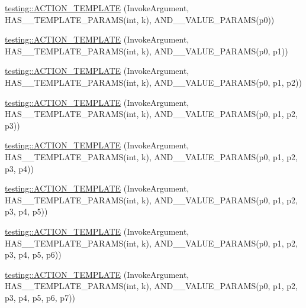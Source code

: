 \begin{DoxyCompactItemize}
\item 
\mbox{\hyperlink{namespacetesting_afaa0d88f5442f9aee5d6147377d3e50c}{testing\+::\+A\+C\+T\+I\+O\+N\+\_\+\+T\+E\+M\+P\+L\+A\+TE}} (Invoke\+Argument, H\+A\+S\+\_\+\_\+\+T\+E\+M\+P\+L\+A\+T\+E\+\_\+\+P\+A\+R\+A\+MS(int, k), A\+N\+D\+\_\+\_\+\+V\+A\+L\+U\+E\+\_\+\+P\+A\+R\+A\+MS(p0))
\item 
\mbox{\hyperlink{namespacetesting_a39bf6c49dc1323cc9539a12249e60aba}{testing\+::\+A\+C\+T\+I\+O\+N\+\_\+\+T\+E\+M\+P\+L\+A\+TE}} (Invoke\+Argument, H\+A\+S\+\_\+\_\+\+T\+E\+M\+P\+L\+A\+T\+E\+\_\+\+P\+A\+R\+A\+MS(int, k), A\+N\+D\+\_\+\_\+\+V\+A\+L\+U\+E\+\_\+\+P\+A\+R\+A\+MS(p0, p1))
\item 
\mbox{\hyperlink{namespacetesting_ac50647216fdf5197899a3d5034a9a670}{testing\+::\+A\+C\+T\+I\+O\+N\+\_\+\+T\+E\+M\+P\+L\+A\+TE}} (Invoke\+Argument, H\+A\+S\+\_\+\_\+\+T\+E\+M\+P\+L\+A\+T\+E\+\_\+\+P\+A\+R\+A\+MS(int, k), A\+N\+D\+\_\+\_\+\+V\+A\+L\+U\+E\+\_\+\+P\+A\+R\+A\+MS(p0, p1, p2))
\item 
\mbox{\hyperlink{namespacetesting_ae98e43eecf8f44990b39b460f00b397b}{testing\+::\+A\+C\+T\+I\+O\+N\+\_\+\+T\+E\+M\+P\+L\+A\+TE}} (Invoke\+Argument, H\+A\+S\+\_\+\_\+\+T\+E\+M\+P\+L\+A\+T\+E\+\_\+\+P\+A\+R\+A\+MS(int, k), A\+N\+D\+\_\+\_\+\+V\+A\+L\+U\+E\+\_\+\+P\+A\+R\+A\+MS(p0, p1, p2, p3))
\item 
\mbox{\hyperlink{namespacetesting_a505f6d82df233802c5f4235d77dca164}{testing\+::\+A\+C\+T\+I\+O\+N\+\_\+\+T\+E\+M\+P\+L\+A\+TE}} (Invoke\+Argument, H\+A\+S\+\_\+\_\+\+T\+E\+M\+P\+L\+A\+T\+E\+\_\+\+P\+A\+R\+A\+MS(int, k), A\+N\+D\+\_\+\_\+\+V\+A\+L\+U\+E\+\_\+\+P\+A\+R\+A\+MS(p0, p1, p2, p3, p4))
\item 
\mbox{\hyperlink{namespacetesting_ab85e5f54a209bf141fc04f8612fbe887}{testing\+::\+A\+C\+T\+I\+O\+N\+\_\+\+T\+E\+M\+P\+L\+A\+TE}} (Invoke\+Argument, H\+A\+S\+\_\+\_\+\+T\+E\+M\+P\+L\+A\+T\+E\+\_\+\+P\+A\+R\+A\+MS(int, k), A\+N\+D\+\_\+\_\+\+V\+A\+L\+U\+E\+\_\+\+P\+A\+R\+A\+MS(p0, p1, p2, p3, p4, p5))
\item 
\mbox{\hyperlink{namespacetesting_a8d3590561f334d165c620f522219831b}{testing\+::\+A\+C\+T\+I\+O\+N\+\_\+\+T\+E\+M\+P\+L\+A\+TE}} (Invoke\+Argument, H\+A\+S\+\_\+\_\+\+T\+E\+M\+P\+L\+A\+T\+E\+\_\+\+P\+A\+R\+A\+MS(int, k), A\+N\+D\+\_\+\_\+\+V\+A\+L\+U\+E\+\_\+\+P\+A\+R\+A\+MS(p0, p1, p2, p3, p4, p5, p6))
\item 
\mbox{\hyperlink{namespacetesting_a8725892aafb62cc8f6f76280d29595d8}{testing\+::\+A\+C\+T\+I\+O\+N\+\_\+\+T\+E\+M\+P\+L\+A\+TE}} (Invoke\+Argument, H\+A\+S\+\_\+\_\+\+T\+E\+M\+P\+L\+A\+T\+E\+\_\+\+P\+A\+R\+A\+MS(int, k), A\+N\+D\+\_\+\_\+\+V\+A\+L\+U\+E\+\_\+\+P\+A\+R\+A\+MS(p0, p1, p2, p3, p4, p5, p6, p7))

\end{DoxyCompactItemize}
